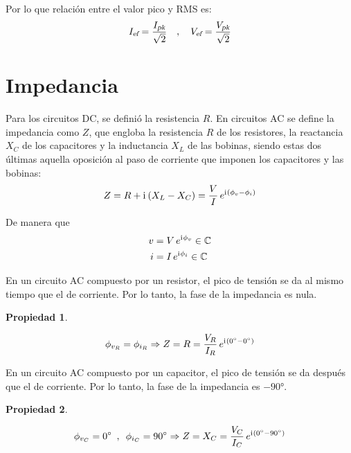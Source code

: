 \documentclass[a5paper,12pt,twoside]{book}
\newtheorem{prop}{{Propiedad}}[chapter]
\begin{document}
Por lo que relación entre el valor pico y RMS es:
\begin{equation*}
    {{{I}_\textsl{{ef}}}} = \frac{{{{I}_\textsl{{pk}}}}}{\sqrt{2}}
    \quad , \quad
    {{{V}_\textsl{{ef}}}} = \frac{{{{V}_\textsl{{pk}}}}}{\sqrt{2}}
\end{equation*}


\section{Impedancia}

Para los circuitos DC, se definió la resistencia $R$. En circuitos AC se define la impedancia como $Z$, que engloba la resistencia $R$ de los resistores, la reactancia $X_C$ de los capacitores y la inductancia $X_L$ de las bobinas, siendo estas dos últimas aquella oposición al paso de corriente que imponen los capacitores y las bobinas:
\begin{equation}
    Z = R + \mathrm{i}\mkern1mu \left(X_L - X_C\right) = \frac{V}{I} \, e^{\mathrm{i}\mkern1mu \left(\phi_v - \phi_i\right)}
\end{equation}

De manera que
\begin{align*}
    v &= V \, e^{\mathrm{i}\mkern1mu \phi_v} \in \mathbb{C}
    \\
    i &= I \, e^{\mathrm{i}\mkern1mu \phi_i} \in \mathbb{C}
\end{align*}

En un circuito AC compuesto por un resistor, el pico de tensión se da al mismo tiempo que el de corriente. Por lo tanto, la fase de la impedancia es nula.

\begin{mdframed}[style=MyFrame1]
    \begin{prop}
    \end{prop}
    \begin{equation*}
        \phi_{v_R} = \phi_{i_R} \Rightarrow Z = R = \frac{V_R}{I_R} \, e^{\mathrm{i}\mkern1mu \left(\ang{0} - \ang{0}\right)}
    \end{equation*}
\end{mdframed}

En un circuito AC compuesto por un capacitor, el pico de tensión se da después que el de corriente. Por lo tanto, la fase de la impedancia es $-\ang{90}$.

\begin{mdframed}[style=MyFrame1]
    \begin{prop}
    \end{prop}
    \begin{equation*}
        \phi_{v_C} = \ang{0} \enspace , \enspace \phi_{i_C} = \ang{90} \Rightarrow Z = X_C = \frac{V_C}{I_C} \, e^{\mathrm{i}\mkern1mu \left(\ang{0} - \ang{90}\right)}
    \end{equation*}
\end{mdframed}
\end{document}
